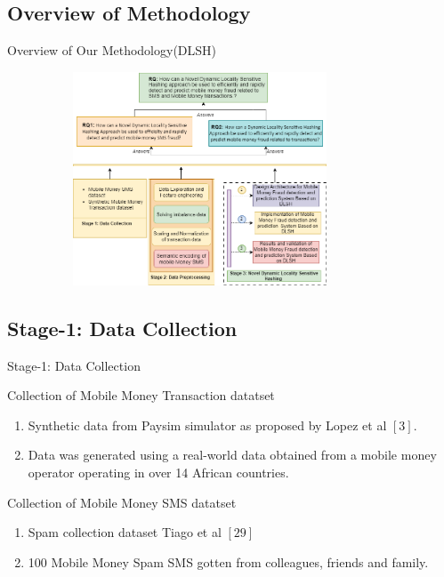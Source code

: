 \documentclass[11pt,aspectratio=169]{beamer}
\begin{document}
		\subsection{Overview of Methodology}
		\begin{frame}{ Overview of Our Methodology(DLSH)}
			\begin{center}
				\includegraphics[width=325pt,height=180pt]{assets/methodology.png}
			\end{center}
		
		\end{frame}
	
	\subsection{Stage-1: Data Collection}
		\begin{frame}{ Stage-1: Data Collection}
			\begin{block}{Collection of Mobile Money Transaction datatset}
				\begin{enumerate}
					\item Synthetic data from Paysim simulator as proposed by Lopez et al $[3]$. 
					\item Data was generated using a real-world data obtained from a mobile money operator operating in over 14 African countries. 
				\end{enumerate}
			\end{block}
		
			\begin{block}{Collection of Mobile Money SMS datatset}
				\begin{enumerate}
					\item Spam collection dataset Tiago et al $[29]$   
					\item 100 Mobile Money Spam SMS gotten from colleagues, friends and family.
				\end{enumerate}
			\end{block}

		\end{frame}
	
\end{document}
